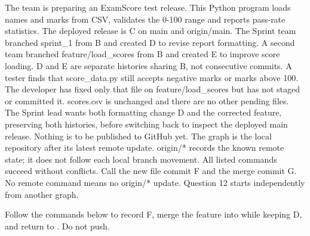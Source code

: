 \begin{contenttable}
{The team is preparing an ExamScore test release. This Python program loads names and marks from CSV, validates the 0-100 range and reports pass-rate statistics. The deployed release is C on main and origin/main. The Sprint team branched sprint\_1 from B and created D to revise report formatting. A second team branched feature/load\_scores from B and created E to improve score loading. D and E are separate histories sharing B, not consecutive commits.}
{A tester finds that score\_data.py still accepts negative marks or marks above 100. The developer has fixed only that file on feature/load\_scores but has not staged or committed it. scores.csv is unchanged and there are no other pending files. The Sprint lead wants both formatting change D and the corrected feature, preserving both histories, before switching back to inspect the deployed main release. Nothing is to be published to GitHub yet.}
{The graph is the local repository after its latest remote update. origin/* records the known remote state; it does not follow each local branch movement. All listed commands succeed without conflicts. Call the new file commit F and the merge commit G. No remote command means no origin/* update. Question 12 starts independently from another graph.}
\end{contenttable}
{Follow the commands below to record F, merge the feature into  while keeping D, and return to . Do not push.}

